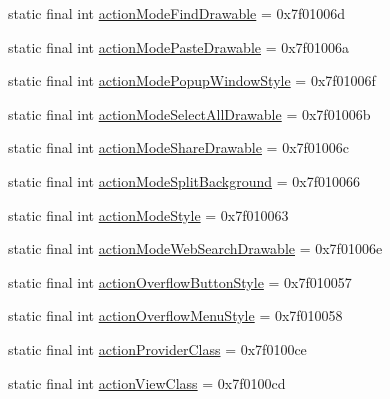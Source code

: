 \begin{CompactItemize}
\item 
static final int \hyperlink{classandroid_1_1support_1_1graphics_1_1drawable_1_1animated_1_1_r_1_1attr_c5e2df86bc40fbf00e7451a10631dc52}{actionModeFindDrawable} = 0x7f01006d
\item 
static final int \hyperlink{classandroid_1_1support_1_1graphics_1_1drawable_1_1animated_1_1_r_1_1attr_01d0ffa0814d664f4e7cef4f90bb35ec}{actionModePasteDrawable} = 0x7f01006a
\item 
static final int \hyperlink{classandroid_1_1support_1_1graphics_1_1drawable_1_1animated_1_1_r_1_1attr_8c48e37a09f7a0c0684a5902973f0da3}{actionModePopupWindowStyle} = 0x7f01006f
\item 
static final int \hyperlink{classandroid_1_1support_1_1graphics_1_1drawable_1_1animated_1_1_r_1_1attr_4beaf7aba912a0b344433d4e6a98655f}{actionModeSelectAllDrawable} = 0x7f01006b
\item 
static final int \hyperlink{classandroid_1_1support_1_1graphics_1_1drawable_1_1animated_1_1_r_1_1attr_94df30624ed2cf00803e73bd7d70ae55}{actionModeShareDrawable} = 0x7f01006c
\item 
static final int \hyperlink{classandroid_1_1support_1_1graphics_1_1drawable_1_1animated_1_1_r_1_1attr_c04ce3d3ae8d5eba409302e751128f92}{actionModeSplitBackground} = 0x7f010066
\item 
static final int \hyperlink{classandroid_1_1support_1_1graphics_1_1drawable_1_1animated_1_1_r_1_1attr_4fb55d4a0d9302d15ef95773abbe9449}{actionModeStyle} = 0x7f010063
\item 
static final int \hyperlink{classandroid_1_1support_1_1graphics_1_1drawable_1_1animated_1_1_r_1_1attr_816294569ae7a798d00f22ca9634adb8}{actionModeWebSearchDrawable} = 0x7f01006e
\item 
static final int \hyperlink{classandroid_1_1support_1_1graphics_1_1drawable_1_1animated_1_1_r_1_1attr_342ae6b0ce500d3c1593df9ff1f986aa}{actionOverflowButtonStyle} = 0x7f010057
\item 
static final int \hyperlink{classandroid_1_1support_1_1graphics_1_1drawable_1_1animated_1_1_r_1_1attr_f2a1a45194053ab605ed493dde56fdc9}{actionOverflowMenuStyle} = 0x7f010058
\item 
static final int \hyperlink{classandroid_1_1support_1_1graphics_1_1drawable_1_1animated_1_1_r_1_1attr_9387bebf2bf59553a2dd6f14f0937932}{actionProviderClass} = 0x7f0100ce
\item 
static final int \hyperlink{classandroid_1_1support_1_1graphics_1_1drawable_1_1animated_1_1_r_1_1attr_675e11392ee053057a936e93f3d33025}{actionViewClass} = 0x7f0100cd

\end{CompactItemize}
